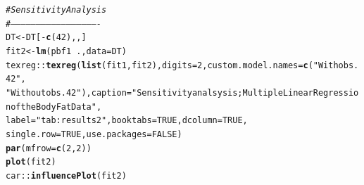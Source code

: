 \documentclass[11pt,letter]{article}\usepackage[]{graphicx}\usepackage[]{color}
\makeatletter
\newcommand{\hlnum}[1]{\textcolor[rgb]{0.686,0.059,0.569}{#1}}%
\newcommand{\hlstr}[1]{\textcolor[rgb]{0.192,0.494,0.8}{#1}}%
\newcommand{\hlcom}[1]{\textcolor[rgb]{0.678,0.584,0.686}{\textit{#1}}}%
\newcommand{\hlopt}[1]{\textcolor[rgb]{0,0,0}{#1}}%
\newcommand{\hlstd}[1]{\textcolor[rgb]{0.345,0.345,0.345}{#1}}%
\newcommand{\hlkwb}[1]{\textcolor[rgb]{0.69,0.353,0.396}{#1}}%
\newcommand{\hlkwc}[1]{\textcolor[rgb]{0.333,0.667,0.333}{#1}}%
\newcommand{\hlkwd}[1]{\textcolor[rgb]{0.737,0.353,0.396}{\textbf{#1}}}%
\newenvironment{kframe}{%
 \def\at@end@of@kframe{}%
 \ifinner\ifhmode%
  \def\at@end@of@kframe{\end{minipage}}%
  \begin{minipage}{\columnwidth}%
 \fi\fi%
 \def\FrameCommand##1{\hskip\@totalleftmargin \hskip-\fboxsep
 \colorbox{shadecolor}{##1}\hskip-\fboxsep
     \hskip-\linewidth \hskip-\@totalleftmargin \hskip\columnwidth}%
 \MakeFramed {\advance\hsize-\width
   \@totalleftmargin\z@ \linewidth\hsize
   \@setminipage}}%
 {\par\unskip\endMakeFramed%
 \at@end@of@kframe}
\newenvironment{knitrout}{}{} %
\makeatother
\begin{document}
\begin{knitrout}
\begin{kframe}
\begin{alltt}
\hlcom{# Sensitivity Analysis}
\hlcom{# ----------------------------------------------------}
\hlstd{DT} \hlkwb{<-} \hlstd{DT[}\hlopt{-}\hlkwd{c}\hlstd{(}\hlnum{42}\hlstd{), , ]}
\hlstd{fit2} \hlkwb{<-} \hlkwd{lm}\hlstd{(pbf1} \hlopt{~} \hlstd{.,} \hlkwc{data} \hlstd{= DT)}
\hlstd{texreg}\hlopt{::}\hlkwd{texreg}\hlstd{(}\hlkwd{list}\hlstd{(fit1, fit2),} \hlkwc{digits} \hlstd{=} \hlnum{2}\hlstd{,} \hlkwc{custom.model.names} \hlstd{=} \hlkwd{c}\hlstd{(}\hlstr{"With obs. 42"}\hlstd{,}
    \hlstr{"Without obs. 42"}\hlstd{),} \hlkwc{caption} \hlstd{=} \hlstr{"Sensitivity analsysis; Multiple Linear Regression of the Body Fat Data"}\hlstd{,}
    \hlkwc{label} \hlstd{=} \hlstr{"tab:results2"}\hlstd{,} \hlkwc{booktabs} \hlstd{=} \hlnum{TRUE}\hlstd{,} \hlkwc{dcolumn} \hlstd{=} \hlnum{TRUE}\hlstd{,}
    \hlkwc{single.row} \hlstd{=} \hlnum{TRUE}\hlstd{,} \hlkwc{use.packages} \hlstd{=} \hlnum{FALSE}\hlstd{)}
\hlkwd{par}\hlstd{(}\hlkwc{mfrow} \hlstd{=} \hlkwd{c}\hlstd{(}\hlnum{2}\hlstd{,} \hlnum{2}\hlstd{))}
\hlkwd{plot}\hlstd{(fit2)}
\hlstd{car}\hlopt{::}\hlkwd{influencePlot}\hlstd{(fit2)}
\end{alltt}
\end{kframe}
\end{knitrout}
\end{document}
